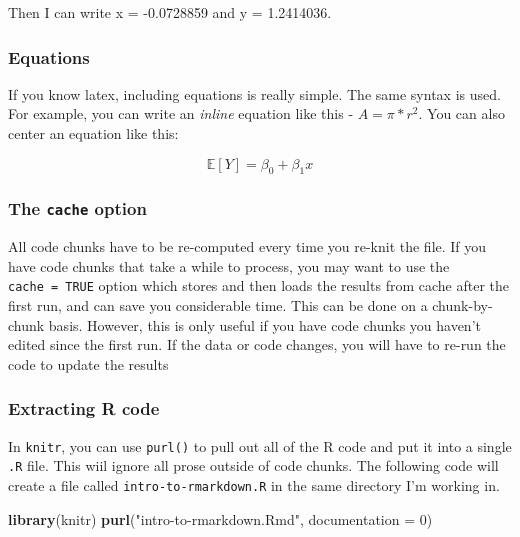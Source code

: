 \documentclass[
]{article}
\newenvironment{Shaded}{\begin{snugshade}}{\end{snugshade}}
\newcommand{\DataTypeTok}[1]{\textcolor[rgb]{0.13,0.29,0.53}{#1}}
\newcommand{\DecValTok}[1]{\textcolor[rgb]{0.00,0.00,0.81}{#1}}
\newcommand{\KeywordTok}[1]{\textcolor[rgb]{0.13,0.29,0.53}{\textbf{#1}}}
\newcommand{\NormalTok}[1]{#1}
\newcommand{\StringTok}[1]{\textcolor[rgb]{0.31,0.60,0.02}{#1}}
\begin{document}
Then I can write x = -0.0728859 and y = 1.2414036.

\hypertarget{equations}{%
\subsubsection{Equations}\label{equations}}

If you know latex, including equations is really simple. The same syntax
is used. For example, you can write an \emph{inline} equation like this
- \(A = \pi*r^{2}\). You can also center an equation like this:

\begin{equation}
\mathbb{E}[Y] = \beta_0 + \beta_1x
\end{equation}

\hypertarget{the-cache-option}{%
\subsubsection{\texorpdfstring{The \texttt{cache}
option}{The cache option}}\label{the-cache-option}}

All code chunks have to be re-computed every time you re-knit the file.
If you have code chunks that take a while to process, you may want to
use the \texttt{cache\ =\ TRUE} option which stores and then loads the
results from cache after the first run, and can save you considerable
time. This can be done on a chunk-by-chunk basis. However, this is only
useful if you have code chunks you haven't edited since the first run.
If the data or code changes, you will have to re-run the code to update
the results

\hypertarget{extracting-r-code}{%
\subsubsection{Extracting R code}\label{extracting-r-code}}

In \texttt{knitr}, you can use \texttt{purl()} to pull out all of the R
code and put it into a single \texttt{.R} file. This wiil ignore all
prose outside of code chunks. The following code will create a file
called \texttt{intro-to-rmarkdown.R} in the same directory I'm working
in.

\begin{Shaded}
\begin{Highlighting}[]
\KeywordTok{library}\NormalTok{(knitr)}
\KeywordTok{purl}\NormalTok{(}\StringTok{"intro-to-rmarkdown.Rmd"}\NormalTok{, }\DataTypeTok{documentation =} \DecValTok{0}\NormalTok{)}
\end{Highlighting}
\end{Shaded}
\end{document}
